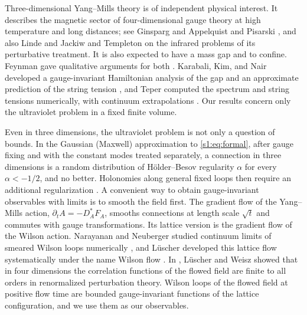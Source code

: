 Three-dimensional Yang--Mills theory is of independent physical interest. It describes the magnetic sector of four-dimensional gauge theory at high temperature and long distances; see Ginsparg \cite{Ginsparg1980} and Appelquist and Pisarski \cite{AppelquistPisarski1981}, and also Linde \cite{Linde1980} and Jackiw and Templeton \cite{JackiwTempleton1981} on the infrared problems of its perturbative treatment. It is also expected to have a mass gap and to confine. Feynman gave qualitative arguments for both \cite{Feynman1981}. Karabali, Kim, and Nair developed a gauge-invariant Hamiltonian analysis of the gap and an approximate prediction of the string tension \cite{Karabali1998a,Karabali1998b}, and Teper computed the spectrum and string tensions numerically, with continuum extrapolations \cite{Teper1999}. Our results concern only the ultraviolet problem in a fixed finite volume.

Even in three dimensions, the ultraviolet problem is not only a question of bounds. In the Gaussian (Maxwell) approximation to \eqref{s1:eq:formal}, after gauge fixing and with the constant modes treated separately, a connection in three dimensions is a random distribution of H\"older--Besov regularity $\alpha$ for every $\alpha<-1/2$, and no better. Holonomies along general fixed loops then require an additional regularization \cite{CCState2023v4,CCHeat2022v4}. A convenient way to obtain gauge-invariant observables with limits is to smooth the field first. The gradient flow of the Yang--Mills action, $\partial_tA=-D_A^*F_A$, smooths connections at length scale $\sqrt t$ and commutes with gauge transformations. Its lattice version is the gradient flow of the Wilson action. Narayanan and Neuberger studied continuum limits of smeared Wilson loops numerically \cite{NarayananNeuberger2006}, and L\"uscher developed this lattice flow systematically under the name Wilson flow \cite{Luscher2010a,Luscher2010WilsonFlow}. In \cite{LuscherWeisz2011}, L\"uscher and Weisz showed that in four dimensions the correlation functions of the flowed field are finite to all orders in renormalized perturbation theory. Wilson loops of the flowed field at positive flow time are bounded gauge-invariant functions of the lattice configuration, and we use them as our observables.

